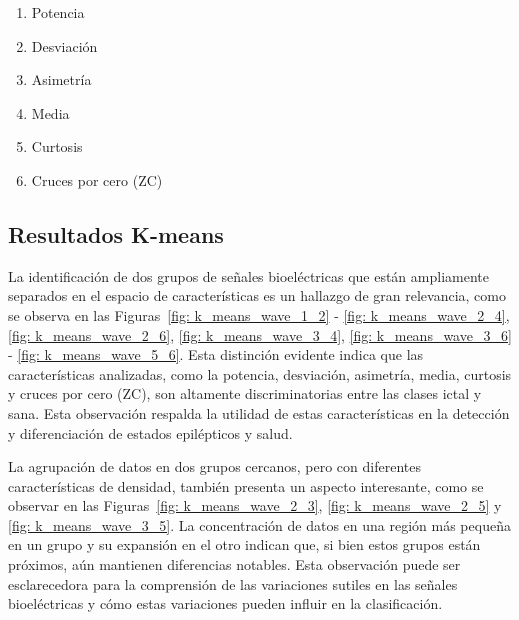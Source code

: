 \begin{enumerate}
    \item Potencia
    \item Desviación
    \item Asimetría
    \item Media
    \item Curtosis
    \item Cruces por cero (ZC)
\end{enumerate}


\subsection{Resultados K-means}
 La identificación de dos grupos de señales bioeléctricas que están ampliamente separados en el espacio de características es un hallazgo de gran relevancia, como se observa en las Figuras~\ref{fig: k_means_wave_1_2} - \ref{fig: k_means_wave_2_4}, \ref{fig: k_means_wave_2_6}, \ref{fig: k_means_wave_3_4}, \ref{fig: k_means_wave_3_6} - \ref{fig: k_means_wave_5_6}. Esta distinción evidente indica que las características analizadas, como la potencia, desviación, asimetría, media, curtosis y cruces por cero (ZC), son altamente discriminatorias entre las clases ictal y sana. Esta observación respalda la utilidad de estas características en la detección y diferenciación de estados epilépticos y salud.

La agrupación de datos en dos grupos cercanos, pero con diferentes características de densidad, también presenta un aspecto interesante, como se observar en las Figuras~\ref{fig: k_means_wave_2_3}, \ref{fig: k_means_wave_2_5} y \ref{fig: k_means_wave_3_5}. La concentración de datos en una región más pequeña en un grupo y su expansión en el otro indican que, si bien estos grupos están próximos, aún mantienen diferencias notables. Esta observación puede ser esclarecedora para la comprensión de las variaciones sutiles en las señales bioeléctricas y cómo estas variaciones pueden influir en la clasificación.

